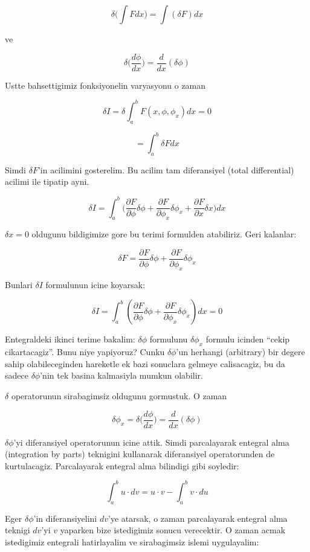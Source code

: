 \documentclass[12pt,fleqn]{article}
\begin{document}
\[ \delta \bigg( \int F dx \bigg) = \int (\delta F)dx \]

ve

\[ \delta \bigg( \frac{d\phi}{dx} \bigg) = \frac{d}{dx}(\delta \phi) \]

Ustte bahsettigimiz fonksiyonelin varyasyonu o zaman

\[ \delta I = \delta \int_a^b F(x,\phi,\phi_x)dx = 0 \]

\[ = \int_a^b \delta F dx  \]

Simdi $\delta F$'in acilimini gosterelim. Bu acilim tam diferansiyel (total
differential) acilimi ile tipatip ayni. 

\[ \delta I = \int_{a}^{b} \bigg(
\frac{\partial F}{\partial \phi}\delta\phi +
\frac{\partial F}{\partial \phi_x}\delta\phi_x +
\frac{\partial F}{\partial x}\delta x 
\bigg) dx
 \]

 $\delta x = 0$ oldugunu bildigimize gore bu terimi formulden
 atabiliriz. Geri kalanlar:

\[ 
\delta F = 
\frac{\partial F}{\partial \phi}\delta\phi +
\frac{\partial F}{\partial \phi_x}\delta\phi_x  
\]

Bunlari $\delta I$ formulunun icine koyarsak:

\[ 
\delta I  = \int_{a}^{b} (
\frac{\partial F}{\partial \phi}\delta\phi +
\frac{\partial F}{\partial \phi_x}\delta\phi_x 
) dx = 0
 \]

Entegraldeki ikinci terime bakalim: $\delta \phi$ formulunu $\delta
\phi_x$ formulu icinden ``cekip cikartacagiz''. Bunu niye yapiyoruz?
Cunku $\delta \phi$'un herhangi (arbitrary) bir degere sahip
olabileceginden hareketle ek bazi sonuclara gelmeye calisacagiz, bu
da sadece $\delta \phi$'nin tek basina kalmasiyla mumkun olabilir.

$\delta$ operatorunun sirabagimsiz oldugunu gormustuk. O zaman 

\[ 
\delta \phi_x = \delta \bigg( \frac{d\phi}{dx} \bigg) =
\frac{d}{dx}(\delta \phi)
 \]

$\delta \phi$'yi diferansiyel operatorunun icine attik. Simdi parcalayarak
entegral alma (integration by parts) teknigini kullanarak diferansiyel
operatorunden de kurtulacagiz. Parcalayarak entegral alma bilindigi gibi 
soyledir:

\[ \int_a^b u \cdot dv = u \cdot v - \int_a^b v \cdot du \]

Eger $\delta \phi$'in diferansiyelini $dv$'ye atarsak, o zaman parcalayarak
entegral alma teknigi $dv$'yi $v$ yaparken bize istedigimiz sonucu verecektir. O
zaman acmak istedigimiz entegrali hatirlayalim ve sirabagimsiz islemi uygulayalim:
\end{document}
